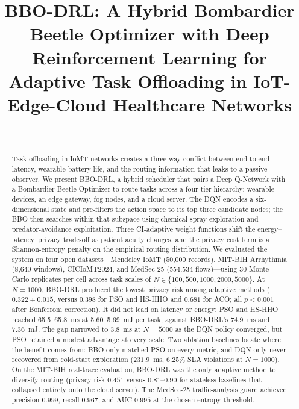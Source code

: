 \documentclass[journal]{IEEEtran}
\title{BBO-DRL: A Hybrid Bombardier Beetle Optimizer with Deep
Reinforcement Learning for Adaptive Task Offloading in
IoT-Edge-Cloud Healthcare Networks}
\author{%
  \IEEEauthorblockN{Anay Sinha}\\
  \IEEEauthorblockA{Department of Electrical and Computer Engineering,
    University of Florida,\\
    Gainesville, FL 32611, USA\\
    Email: sinhal.a@northeastern.edu}
}
\begin{document}
\maketitle

\begin{abstract}
Task offloading in IoMT networks creates a three-way conflict between
end-to-end latency, wearable battery life, and the routing information
that leaks to a passive observer. We present BBO-DRL, a hybrid
scheduler that pairs a Deep Q-Network with a Bombardier Beetle
Optimizer to route tasks across a four-tier hierarchy: wearable
devices, an edge gateway, fog nodes, and a cloud server. The DQN
encodes a six-dimensional state and pre-filters the action space to its
top three candidate nodes; the BBO then searches within that subspace
using chemical-spray exploration and predator-avoidance exploitation.
Three CI-adaptive weight functions shift the energy--latency--privacy
trade-off as patient acuity changes, and the privacy cost term is a
Shannon-entropy penalty on the empirical routing distribution. We
evaluated the system on four open datasets---Mendeley IoMT (50{,}000
records), MIT-BIH Arrhythmia (8{,}640 windows), CICIoMT2024, and
MedSec-25 (554{,}534 flows)---using 30 Monte Carlo replicates per cell
across task scales of $N \in \{100, 500, 1000, 2000, 5000\}$. At
$N = 1000$, BBO-DRL produced the lowest privacy risk among adaptive
methods ($0.322 \pm 0.015$, versus $0.398$ for PSO and HS-HHO and
$0.681$ for ACO; all $p < 0.001$ after Bonferroni correction). It did
not lead on latency or energy: PSO and HS-HHO reached 65.5--65.8~ms
at 5.60--5.69~mJ per task, against BBO-DRL's 74.9~ms and 7.36~mJ.
The gap narrowed to 3.8~ms at $N = 5000$ as the DQN policy converged,
but PSO retained a modest advantage at every scale. Two ablation
baselines locate where the benefit comes from: BBO-only matched PSO on
every metric, and DQN-only never recovered from cold-start exploration
($231.9$~ms, $6.25\%$ SLA violations at $N = 1000$). On the MIT-BIH
real-trace evaluation, BBO-DRL was the only adaptive method to
diversify routing (privacy risk $0.451$ versus $0.81$--$0.90$ for
stateless baselines that collapsed entirely onto the cloud server).
The MedSec-25 traffic-analysis guard achieved precision $0.999$,
recall $0.967$, and AUC $0.995$ at the chosen entropy threshold.
\end{abstract}
\end{document}
